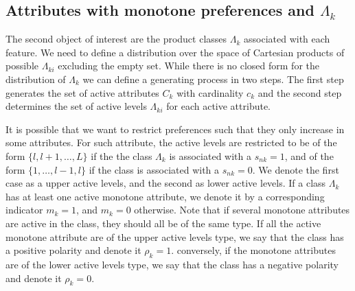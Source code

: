 \documentclass[12pt]{article}
\begin{document}
\subsection{Attributes with monotone preferences and $\Lambda_k$} \label{sec:lambda}

The second object of interest are the product classes $\Lambda_k$ associated with each feature. 
We need to define a distribution over the space of Cartesian products of possible $\Lambda_{ki}$ excluding the empty set. 
While there is no closed form for the distribution of $\Lambda_k$ we can define a generating process in two steps. The first step generates the set of active attributes $C_{k}$ with cardinality $c_k$ and the second step determines the set of active levels $\Lambda_{ki}$ for each active attribute.

It is possible that we want to restrict preferences such that they only increase in some attributes.
For such attribute, the active levels are restricted to be of the form $\{l,l+1,\ldots,L\}$ if the the class $\Lambda_k$ is associated with a $s_{nk}=1$, and of the form $\{1,\ldots,l-1,l\}$ if the class is associated with a $s_{nk}=0$. We denote the first case as a upper active levels, and the second as lower active levels. If a class $\Lambda_k$ has at least one active monotone attribute, we denote it by a corresponding indicator $m_k=1$, and $m_k=0$ otherwise.
Note that if several monotone attributes are active in the class, they should all be of the same type. If all the active monotone attribute are of the upper active levels type, we say that the class has a positive polarity and denote it $\rho_k=1$. conversely, if the monotone attributes are of the lower active levels type, we say that the class has a negative polarity and denote it $\rho_k=0$.
\end{document}
